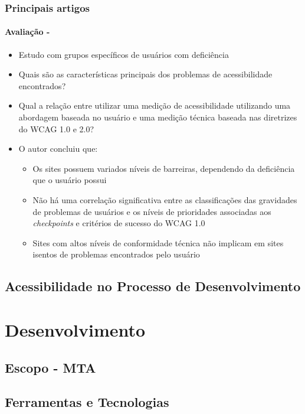 \documentclass{beamer}
\begin{document}
\begin{frame}[allowframebreaks]
\frametitle{Principais artigos}
\framesubtitle{Avaliação - \citet{freire:12}}

\begin{itemize}
  \item Estudo com grupos específicos de usuários com deficiência
  \item Quais são as características principais dos problemas de acessibilidade encontrados?
  \item Qual a relação entre utilizar uma medição de acessibilidade utilizando uma abordagem
baseada no usuário e uma medição técnica baseada nas diretrizes do WCAG 1.0 e 2.0?
  \item O autor concluiu que:
  \begin{itemize}
   	\item Os sites possuem variados níveis de barreiras, dependendo da deficiência que o usuário possui
   	\item Não há uma correlação significativa entre as classificações das gravidades de problemas de usuários e os níveis de prioridades associadas aos \textit{checkpoints} e critérios de sucesso do WCAG 1.0
   	\item Sites com altos níveis de conformidade técnica não implicam em sites isentos de problemas encontrados pelo usuário
  \end{itemize}
\end{itemize}

\end{frame}


\subsection[MTA]{Acessibilidade no Processo de Desenvolvimento}

\section{Desenvolvimento}

\subsection[Escopo - MTA]{Escopo - MTA}

\subsection[Ferramentas e Tecnologias]{Ferramentas e Tecnologias}
\end{document}

